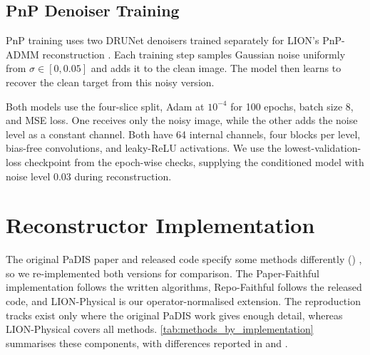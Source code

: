 \subsection{PnP Denoiser Training}
PnP training uses two DRUNet denoisers \cite{zhang_plug-and-play_2022} trained separately for LION's PnP-ADMM reconstruction \cite{chan_plug-and-play_2017}. Each training step samples Gaussian noise uniformly from $\sigma \in[0,0.05]$ and adds it to the clean image. The model then learns to recover the clean target from this noisy version.

Both models use the four-slice split, Adam at $10^{-4}$ for 100 epochs, batch size 8, and MSE loss. One receives only the noisy image, while the other adds the noise level as a constant channel. Both have 64 internal channels, four blocks per level, bias-free convolutions, and leaky-ReLU activations. We use the lowest-validation-loss checkpoint from the epoch-wise checks, supplying the conditioned model with noise level 0.03 during reconstruction.

\section{Reconstructor Implementation}
\label{sec:methods-reconstructor-implementation}

The original PaDIS paper and released code specify some methods differently () \cite{hu_learning_2024,hu_jasonhu4padis_2026-1}, so we re-implemented both versions for comparison. The Paper-Faithful implementation follows the written algorithms, Repo-Faithful follows the released code, and LION-Physical is our operator-normalised extension. The reproduction tracks exist only where the original PaDIS work gives enough detail, whereas LION-Physical covers all methods. \autoref{tab:methods_by_implementation} summarises these components, with differences reported in  and .

